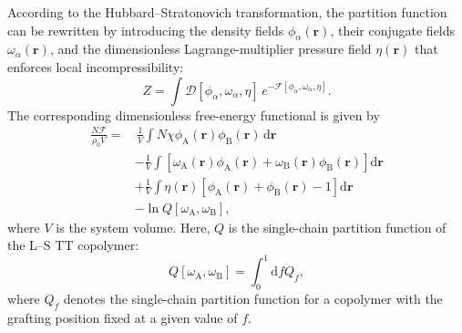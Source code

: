     According to the Hubbard--Stratonovich transformation\cite{Helfand1975Theorya, Leibler1980Theory}, the partition function can be rewritten by introducing the density fields $\phi_\alpha(\bm{r})$, their conjugate fields $\omega_\alpha(\bm{r})$, and the dimensionless Lagrange-multiplier pressure field $\eta(\bm r)$ that enforces local incompressibility:
    \begin{equation}
        Z = \int \mathcal{D}[\phi_\alpha, \omega_\alpha, \eta]\, e^{-\mathcal{F}[\phi_\alpha, \omega_\alpha, \eta]}.
        \label{eq:Z}
    \end{equation}
    The corresponding dimensionless free-energy functional is given by
    \begin{equation}
        \begin{split}
            \frac{N \mathcal{F}}{\rho_0 V} 
            = &\, \frac{1}{V} \int N \chi \phi_{\mathrm{A}}(\bm{r}) \phi_{\mathrm{B}}(\bm{r})\, \mathrm{d}\bm{r} \\
            & - \frac{1}{V} \int \left[ \omega_{\mathrm{A}}(\bm{r}) \phi_{\mathrm{A}}(\bm{r}) 
            + \omega_{\mathrm{B}}(\bm{r}) \phi_{\mathrm{B}}(\bm{r}) \right] \mathrm{d}\bm{r} \\
            & + \frac{1}{V} \int \eta(\bm r)
            \left[\phi_{\mathrm A}(\bm r)+\phi_{\mathrm B}(\bm r)-1\right] \mathrm d\bm r \\
            & - \ln Q[\omega_{\mathrm{A}}, \omega_{\mathrm{B}}],
        \end{split}
        \label{eq:FreeEnergy}
    \end{equation}
    where $V$ is the system volume.
    Here, $Q$ is the single-chain partition function of the L--S TT copolymer: 
    \begin{equation}
        Q[\omega_{\mathrm{A}}, \omega_{\mathrm{B}}]
        = \int_{0}^{1} \mathrm{d} f Q_f,
        \label{eq:Partition}
    \end{equation}
    where $Q_f$ denotes the single-chain partition function for a copolymer with the grafting position fixed at a given value of $f$.


